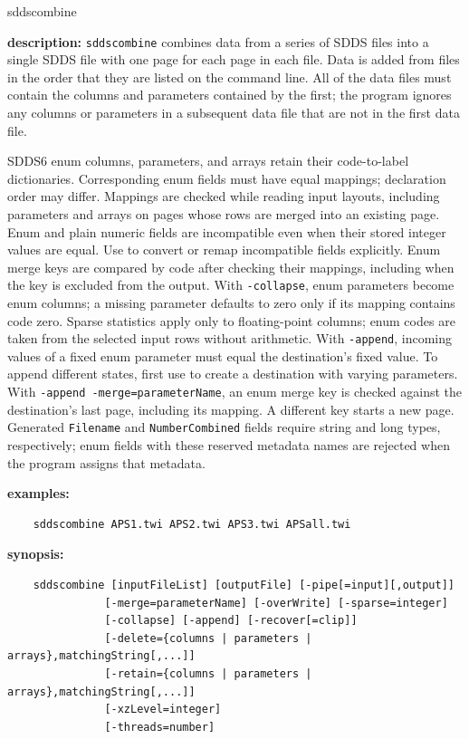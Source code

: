 \begin{sddsprog}{sddscombine}
  \item \textbf{description:} \verb|sddscombine| combines data from a series of SDDS files into a single SDDS file with one page for each page in each file. Data is added from files in the order that they are listed on the command line. All of the data files must contain the columns and parameters contained by the first; the program ignores any columns or parameters in a subsequent data file that are not in the first data file.

  SDDS6 enum columns, parameters, and arrays retain their code-to-label dictionaries.
  Corresponding enum fields must have equal mappings; declaration order may differ.
  Mappings are checked while reading input layouts, including parameters and arrays
  on pages whose rows are merged into an existing page. Enum and plain numeric
  fields are incompatible even when their stored integer values are equal.
  Use  to convert or remap incompatible fields explicitly.
  Enum merge keys are compared by code after checking their mappings, including
  when the key is excluded from the output. With \verb|-collapse|, enum parameters
  become enum columns; a missing parameter defaults to zero only if its mapping
  contains code zero. Sparse statistics apply only to floating-point columns;
  enum codes are taken from the selected input rows without arithmetic.
  With \verb|-append|, incoming values of a fixed enum parameter must equal the
  destination's fixed value. To append different states, first use
   to create a destination with varying parameters.
  With \verb|-append -merge=parameterName|, an enum merge key is checked against
  the destination's last page, including its mapping. A different key starts a new page.
  Generated \verb|Filename| and \verb|NumberCombined| fields require string and
  long types, respectively; enum fields with these reserved metadata names are rejected
  when the program assigns that metadata.

  \item \textbf{examples:}
    \begin{verbatim}
    sddscombine APS1.twi APS2.twi APS3.twi APSall.twi
    \end{verbatim}

  \item \textbf{synopsis:}
    \begin{verbatim}
    sddscombine [inputFileList] [outputFile] [-pipe[=input][,output]]
               [-merge=parameterName] [-overWrite] [-sparse=integer]
               [-collapse] [-append] [-recover[=clip]]
               [-delete={columns | parameters | arrays},matchingString[,...]]
               [-retain={columns | parameters | arrays},matchingString[,...]]
               [-xzLevel=integer]
               [-threads=number]
    \end{verbatim}


\end{sddsprog}
